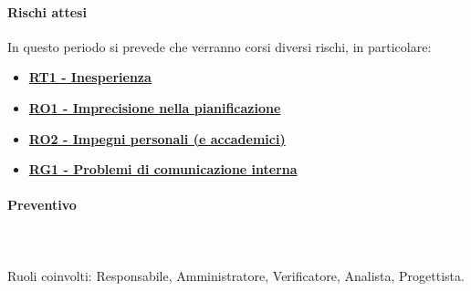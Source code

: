 \paragraph{Rischi attesi}  
In questo periodo si prevede che verranno corsi diversi rischi, in particolare:
\begin{itemize}
    \item \textbf{\hyperlink{RT1}{RT1 - Inesperienza}}
    \item \textbf{\hyperlink{RO1}{RO1 - Imprecisione nella pianificazione}}
    \item \textbf{\hyperlink{RO2}{RO2 - Impegni personali (e accademici)}}
    \item \textbf{\hyperlink{RG1}{RG1 - Problemi di comunicazione interna}}
\end{itemize}

\paragraph{Preventivo} \hspace{1cm} 
\\ \hspace{1cm} \\
Ruoli coinvolti: Responsabile, Amministratore, Verificatore, Analista, Progettista.
\begin{table}[H]
\centering
{}
\caption{Preventivo dell'impegno orario di ciascun membro durante il periodo V}
\end{table}

